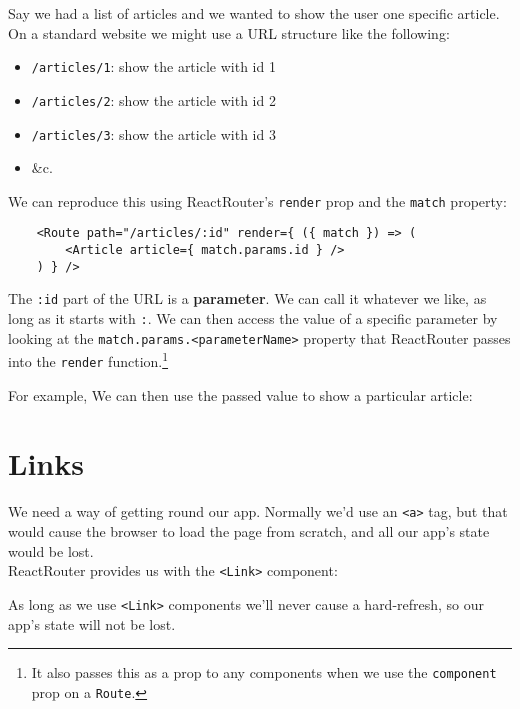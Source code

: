 Say we had a list of articles and we wanted to show the user one specific article. On a standard website we might use a URL structure like the following:

\begin{itemize}
    \item \texttt{/articles/1}: show the article with id 1
    \item \texttt{/articles/2}: show the article with id 2
    \item \texttt{/articles/3}: show the article with id 3
    \item \&c.
\end{itemize}

We can reproduce this using ReactRouter's \texttt{render} prop and the \texttt{match} property:

\begin{verbatim}
    <Route path="/articles/:id" render={ ({ match }) => (
        <Article article={ match.params.id } />
    ) } />
\end{verbatim}

The \texttt{:id} part of the URL is a \textbf{parameter}. We can call it whatever we like, as long as it starts with \texttt{:}. We can then access the value of a specific parameter by looking at the \texttt{match.params.<parameterName>} property that ReactRouter passes into the \texttt{render} function.\footnote{It also passes this as a prop to any components when we use the \texttt{component} prop on a \texttt{Route}.}


\pagebreak


For example, We can then use the passed value to show a particular article:




\section{Links}

We need a way of getting round our app. Normally we'd use an \texttt{<a>} tag, but that would cause the browser to load the page from scratch, and all our app's state would be lost.
\\

ReactRouter provides us with the \texttt{<Link>} component:


As long as we use \texttt{<Link>} components we'll never cause a hard-refresh, so our app's state will not be lost.
\\

